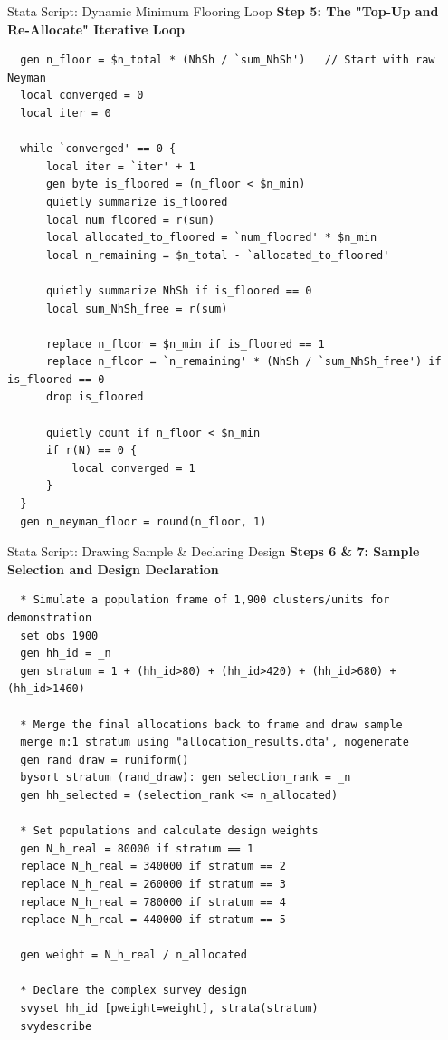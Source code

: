 \documentclass[10pt, aspectratio=169]{beamer}
\begin{document}
  \begin{frame}[fragile]{Stata Script: Dynamic Minimum Flooring Loop}
      \small \textbf{Step 5: The "Top-Up and Re-Allocate" Iterative Loop}
      \vspace{0.1cm}
  \tiny
  \begin{verbatim}
  gen n_floor = $n_total * (NhSh / `sum_NhSh')   // Start with raw Neyman
  local converged = 0
  local iter = 0
  
  while `converged' == 0 {
      local iter = `iter' + 1
      gen byte is_floored = (n_floor < $n_min)
      quietly summarize is_floored
      local num_floored = r(sum)
      local allocated_to_floored = `num_floored' * $n_min
      local n_remaining = $n_total - `allocated_to_floored'
      
      quietly summarize NhSh if is_floored == 0
      local sum_NhSh_free = r(sum)
      
      replace n_floor = $n_min if is_floored == 1
      replace n_floor = `n_remaining' * (NhSh / `sum_NhSh_free') if is_floored == 0
      drop is_floored
      
      quietly count if n_floor < $n_min
      if r(N) == 0 {
          local converged = 1
      }
  }
  gen n_neyman_floor = round(n_floor, 1)
  \end{verbatim}
  \end{frame}
  
  \begin{frame}[fragile]{Stata Script: Drawing Sample \& Declaring Design}
      \small \textbf{Steps 6 \& 7: Sample Selection and Design Declaration}
      \vspace{0.1cm}
  \tiny
  \begin{verbatim}
  * Simulate a population frame of 1,900 clusters/units for demonstration
  set obs 1900
  gen hh_id = _n
  gen stratum = 1 + (hh_id>80) + (hh_id>420) + (hh_id>680) + (hh_id>1460)
  
  * Merge the final allocations back to frame and draw sample
  merge m:1 stratum using "allocation_results.dta", nogenerate
  gen rand_draw = runiform()
  bysort stratum (rand_draw): gen selection_rank = _n
  gen hh_selected = (selection_rank <= n_allocated)
  
  * Set populations and calculate design weights
  gen N_h_real = 80000 if stratum == 1
  replace N_h_real = 340000 if stratum == 2
  replace N_h_real = 260000 if stratum == 3
  replace N_h_real = 780000 if stratum == 4
  replace N_h_real = 440000 if stratum == 5
  
  gen weight = N_h_real / n_allocated
  
  * Declare the complex survey design
  svyset hh_id [pweight=weight], strata(stratum)
  svydescribe
  \end{verbatim}
  \end{frame}
  
\end{document}
